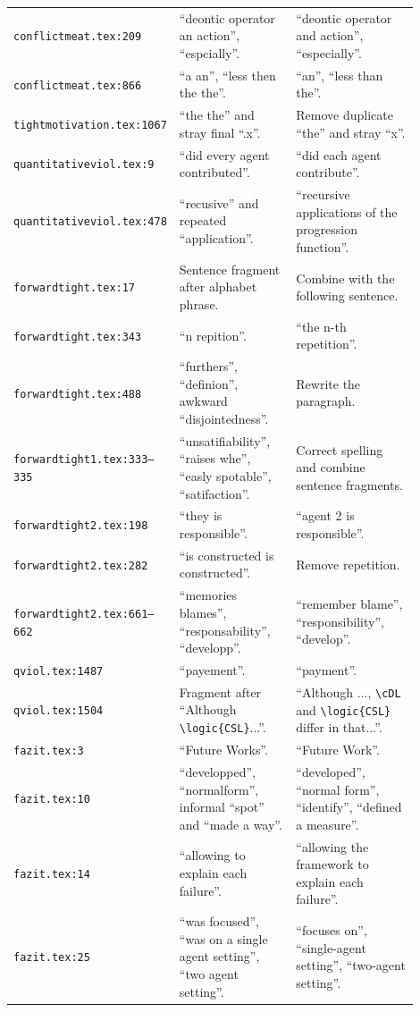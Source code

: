 \documentclass[11pt,a4paper]{article}
\newcommand{\loc}[1]{\texttt{#1}}
\begin{document}
\begin{longtable}{>{\raggedright\arraybackslash}p{0.25\linewidth}
                  >{\raggedright\arraybackslash}p{0.31\linewidth}
                  >{\raggedright\arraybackslash}p{0.34\linewidth}}
\loc{conflictmeat.tex:209} & ``deontic operator an action'', ``espcially''. & ``deontic operator and action'', ``especially''. \\
\loc{conflictmeat.tex:866} & ``a an'', ``less then the the''. & ``an'', ``less than the''. \\
\loc{tightmotivation.tex:1067} & ``the the'' and stray final ``.x''. & Remove duplicate ``the'' and stray ``x''. \\
\loc{quantitativeviol.tex:9} & ``did every agent contributed''. & ``did each agent contribute''. \\
\loc{quantitativeviol.tex:478} & ``recusive'' and repeated ``application''. & ``recursive applications of the progression function''. \\
\loc{forwardtight.tex:17} & Sentence fragment after alphabet phrase. & Combine with the following sentence. \\
\loc{forwardtight.tex:343} & ``n repition''. & ``the n-th repetition''. \\
\loc{forwardtight.tex:488} & ``furthers'', ``definion'', awkward ``disjointedness''. & Rewrite the paragraph. \\
\loc{forwardtight1.tex:333--335} & ``unsatifiability'', ``raises whe'', ``easly spotable'', ``satifaction''. & Correct spelling and combine sentence fragments. \\
\loc{forwardtight2.tex:198} & ``they is responsible''. & ``agent 2 is responsible''. \\
\loc{forwardtight2.tex:282} & ``is constructed is constructed''. & Remove repetition. \\
\loc{forwardtight2.tex:661--662} & ``memories blames'', ``responsability'', ``developp''. & ``remember blame'', ``responsibility'', ``develop''. \\
\loc{qviol.tex:1487} & ``payement''. & ``payment''. \\
\loc{qviol.tex:1504} & Fragment after ``Although \verb|\logic{CSL}|...''. & ``Although ..., \verb|\cDL| and \verb|\logic{CSL}| differ in that...''. \\
\loc{fazit.tex:3} & ``Future Works''. & ``Future Work''. \\
\loc{fazit.tex:10} & ``developped'', ``normalform'', informal ``spot'' and ``made a way''. & ``developed'', ``normal form'', ``identify'', ``defined a measure''. \\
\loc{fazit.tex:14} & ``allowing to explain each failure''. & ``allowing the framework to explain each failure''. \\
\loc{fazit.tex:25} & ``was focused'', ``was on a single agent setting'', ``two agent setting''. & ``focuses on'', ``single-agent setting'', ``two-agent setting''. \\
\end{longtable}
\end{document}
